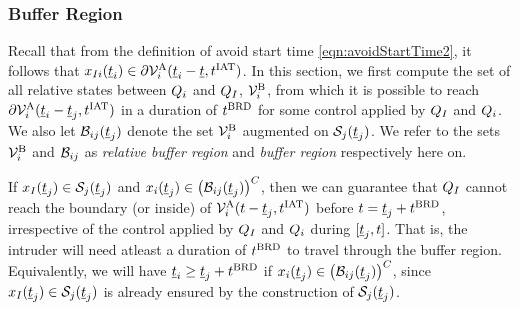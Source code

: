 \subsubsection{Buffer Region} \label{sec:buffRegion_case1}
Recall that from the definition of avoid start time \eqref{eqn:avoidStartTime2}, it follows that $x_{I i}(\underline{t}_i) \in \partial \mathcal{V}^{\text{A}}_{i}(\underline{t}_i-\underline{t}, t^\text{IAT})$. In this section, we first compute the set of all relative states between $Q_i$ and $Q_{I}$, $\mathcal{V}^{\text{B}}_{i}$, from which it is possible to reach $\partial \mathcal{V}^{\text{A}}_{i}(\underline{t}_i-\underline{t}_j, t^\text{IAT})$ in a duration of $t^\text{BRD}$ for some control applied by $Q_{I}$ and $Q_i$. We also let $\mathcal{B}_{ij}(\underline{t}_j)$ denote the set $\mathcal{V}^{\text{B}}_{i}$ augmented on $\mathcal{S}_j(\underline{t}_j)$. We refer to the sets $\mathcal{V}^{\text{B}}_{i}$ and $\mathcal{B}_{ij}$ as \textit{relative buffer region} and \textit{buffer region} respectively here on.

If $x_{I}(\underline{t}_j) \in \mathcal{S}_j(\underline{t}_j)$ and $x_i(\underline{t}_j) \in \left(\mathcal{B}_{ij}(\underline{t}_j)\right)^C$, then we can guarantee that $Q_{I}$ cannot reach the boundary (or inside) of $\mathcal{V}^{\text{A}}_{i}(t-\underline{t}_j, t^\text{IAT})$ before $t = \underline{t}_j + t^\text{BRD}$, irrespective of the control applied by $Q_{I}$ and $Q_i$ during $[\underline{t}_j, t]$. That is, the intruder will need atleast a duration of $t^\text{BRD}$ to travel through the buffer region. Equivalently, we will have $\underline{t}_i \geq \underline{t}_j + t^\text{BRD}$ if $x_i(\underline{t}_j) \in \left(\mathcal{B}_{ij}(\underline{t}_j)\right)^C$, since $x_{I}(\underline{t}_j) \in \mathcal{S}_j(\underline{t}_j)$ is already ensured by the construction of $\mathcal{S}_j(\underline{t}_j)$.
%
%

